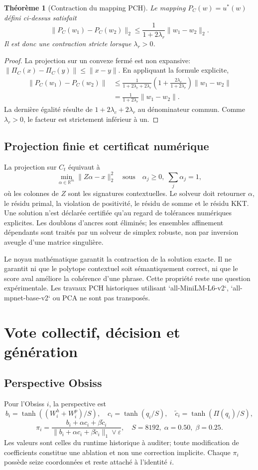 \documentclass[11pt,a4paper]{report}
\newtheorem{theorem}[definition]{Théorème}
\newcommand{\R}{\mathbb R}
\begin{document}
\begin{theorem}[Contraction du mapping PCH]
Le mapping $P_{C}(w)=u^*(w)$ défini ci-dessus satisfait
\[
 \|P_C(w_1)-P_C(w_2)\|_2\le\frac{1}{1+2\lambda_r}\|w_1-w_2\|_2.
\]
Il est donc une contraction stricte lorsque $\lambda_r>0$.
\end{theorem}
\begin{proof}
La projection sur un convexe fermé est non expansive: $\|\Pi_C(x)-\Pi_C(y)\|\le\|x-y\|$. En appliquant la formule explicite,
\[
\begin{aligned}
\|P_C(w_1)-P_C(w_2)\|&\le\frac{1}{1+2\lambda_c+2\lambda_r}
\left(1+\frac{2\lambda_c}{1+2\lambda_r}\right)\|w_1-w_2\|\\
&=\frac{1}{1+2\lambda_r}\|w_1-w_2\|.
\end{aligned}
\]
La dernière égalité résulte de $1+2\lambda_c+2\lambda_r$ au dénominateur commun. Comme $\lambda_r>0$, le facteur est strictement inférieur à un.
\end{proof}

\section{Projection finie et certificat numérique}
La projection sur $C_t$ équivaut à
\[
\min_{\alpha\in\R^m}\|Z\alpha-x\|_2^2\quad\text{sous}\quad
\alpha_j\ge0,\;\sum_j\alpha_j=1,
\]
où les colonnes de $Z$ sont les signatures contextuelles. Le solveur doit retourner $\alpha$, le résidu primal, la violation de positivité, le résidu de somme et le résidu KKT. Une solution n'est déclarée certifiée qu'au regard de tolérances numériques explicites. Les doublons d'ancres sont éliminés; les ensembles affinement dépendants sont traités par un solveur de simplex robuste, non par inversion aveugle d'une matrice singulière.

Le noyau mathématique garantit la contraction de la solution exacte. Il ne garantit ni que le polytope contextuel soit sémantiquement correct, ni que le score aval améliore la cohérence d'une phrase. Cette propriété reste une question expérimentale. Les travaux PCH historiques utilisant `all-MiniLM-L6-v2`, `all-mpnet-base-v2` ou PCA ne sont pas transposés.

\chapter{Vote collectif, décision et génération}
\section{Perspective Obsiss}
Pour l'Obsiss $i$, la perspective est
\[
 b_i=\tanh((W_i^h+W_i^p)/S),\quad
 c_i=\tanh(q_i/S),\quad
 \tilde c_i=\tanh(\Pi(q_i)/S),
\]
\[
 \pi_i=\frac{b_i+\alpha c_i+\beta\tilde c_i}
 {\|b_i+\alpha c_i+\beta\tilde c_i\|_1\vee\varepsilon},
 \quad S=8192,\;\alpha=0.50,\;\beta=0.25.
\]
Les valeurs sont celles du runtime historique à auditer; toute modification de coefficients constitue une ablation et non une correction implicite. Chaque $\pi_i$ possède seize coordonnées et reste attaché à l'identité $i$.
\end{document}
